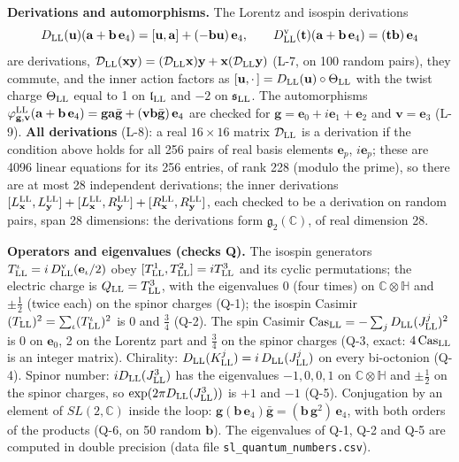 \documentclass[
  10pt,
]{article}
\begin{document}
\textbf{Derivations and automorphisms.} The Lorentz and isospin
derivations
\[D_{\rm LL}(\mathbf u)(\mathbf a+\mathbf b\,\mathbf e_4)=[\mathbf u,\mathbf a]+(-\mathbf b\mathbf u)\,\mathbf e_4,\qquad D^{\rm v}_{\rm LL}(\mathbf t)(\mathbf a+\mathbf b\,\mathbf e_4)=(\mathbf t\mathbf b)\,\mathbf e_4\]
are derivations,
\(\mathcal D_{\rm LL}(\mathbf x\mathbf y)=(\mathcal D_{\rm LL}\mathbf x)\mathbf y+\mathbf x(\mathcal D_{\rm LL}\mathbf y)\)
(L-7, on 100 random pairs), they commute, and the inner action factors
as \([\mathbf u,\cdot\,]=D_{\rm LL}(\mathbf u)\circ\Theta_{\rm LL}\)
with the twist charge \(\Theta_{\rm LL}\) equal to 1 on
\(\mathfrak l_{\rm LL}\) and \(-2\) on \(\mathfrak s_{\rm LL}\). The
automorphisms
\(\varphi^{\rm LL}_{\mathbf g,\mathbf v}(\mathbf a+\mathbf b\,\mathbf e_4)=\mathbf g\mathbf a\bar{\mathbf g}+(\mathbf v\mathbf b\bar{\mathbf g})\,\mathbf e_4\)
are checked for \(\mathbf g=\mathbf e_0+i\mathbf e_1+\mathbf e_2\) and
\(\mathbf v=\mathbf e_3\) (L-9). \textbf{All derivations} (L-8): a real
\(16\times16\) matrix \(\mathcal D_{\rm LL}\) is a derivation if the
condition above holds for all 256 pairs of real basis elements
\(\mathbf e_p\), \(i\mathbf e_p\); these are 4096 linear equations for
its 256 entries, of rank 228 (modulo the prime), so there are at most 28
independent derivations; the inner derivations
\([L^{\rm LL}_{\mathbf x},L^{\rm LL}_{\mathbf y}]+[L^{\rm LL}_{\mathbf x},R^{\rm LL}_{\mathbf y}]+[R^{\rm LL}_{\mathbf x},R^{\rm LL}_{\mathbf y}]\),
each checked to be a derivation on random pairs, span 28 dimensions: the
derivations form \(\mathfrak g_2(\mathbb C)\), of real dimension 28.

\textbf{Operators and eigenvalues (checks Q).} The isospin generators
\(T^\iota_{\rm LL}=i\,D^{\rm v}_{\rm LL}(\mathbf e_\iota/2)\) obey
\([T^1_{\rm LL},T^2_{\rm LL}]=iT^3_{\rm LL}\) and its cyclic
permutations; the electric charge is \(Q_{\rm LL}=T^3_{\rm LL}\), with
the eigenvalues 0 (four times) on \(\mathbb C\otimes\mathbb H\) and
\(\pm\tfrac12\) (twice each) on the spinor charges (Q-1); the isospin
Casimir \((T_{\rm LL})^2=\sum_\iota(T^\iota_{\rm LL})^2\) is 0 and
\(\tfrac34\) (Q-2). The spin Casimir
\(\mathrm{Cas}_{\rm LL}=-\sum_jD_{\rm LL}(J^j_{\rm LL})^2\) is 0 on
\(\mathbf e_0\), 2 on the Lorentz part and \(\tfrac34\) on the spinor
charges (Q-3, exact: \(4\,\mathrm{Cas}_{\rm LL}\) is an integer matrix).
Chirality: \(D_{\rm LL}(K^j_{\rm LL})=i\,D_{\rm LL}(J^j_{\rm LL})\) on
every bi-octonion (Q-4). Spinor number: \(iD_{\rm LL}(J^3_{\rm LL})\)
has the eigenvalues \(-1,0,0,1\) on \(\mathbb C\otimes\mathbb H\) and
\(\pm\tfrac12\) on the spinor charges, so
\(\exp(2\pi D_{\rm LL}(J^3_{\rm LL}))\) is \(+1\) and \(-1\) (Q-5).
Conjugation by an element of \(SL(2,\mathbb C)\) inside the loop:
\(\mathbf g(\mathbf b\,\mathbf e_4)\bar{\mathbf g}=(\mathbf b\,\mathbf g^2)\,\mathbf e_4\),
with both orders of the products (Q-6, on 50 random \(\mathbf b\)). The
eigenvalues of Q-1, Q-2 and Q-5 are computed in double precision (data
file \texttt{sl\_quantum\_numbers.csv}).
\end{document}
